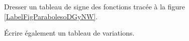 
\begin{exercice}\label{exoPremiere-0060}

Dresser un tableau de signe des fonctions tracée à la figure \ref{LabelFigParabolesoDGyNW}.
\newcommand{\CaptionFigParabolesoDGyNW}{Les graphes de l'exercice \ref{exoPremiere-0060}}

Écrire également un tableau de variations.


\end{exercice}
